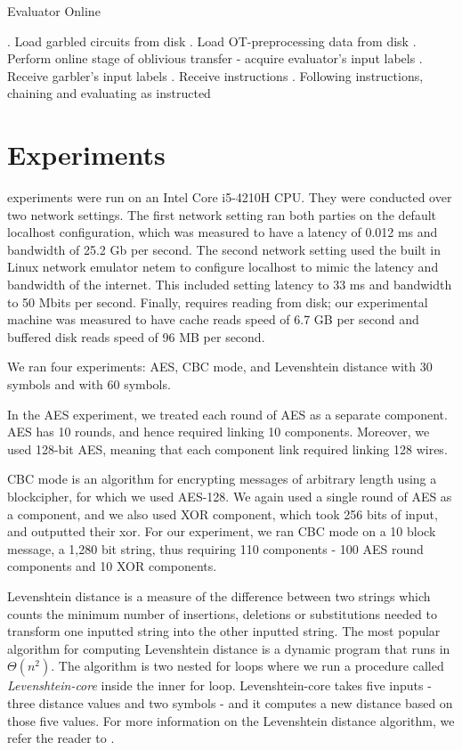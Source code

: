 \begin{algorithm}
    \caption{Evaluator Online}
    \label{alg:evaluator-online}
    \begin{algorithmic}
        . Load garbled circuits from disk
        . Load OT-preprocessing data from disk
        . Perform online stage of oblivious transfer - acquire evaluator's input labels
        . Receive garbler's input labels
        . Receive instructions
        . Following instructions, chaining and evaluating as instructed
    \end{algorithmic}
\end{algorithm}

\section{Experiments}
\CompGC experiments were run on an Intel Core i5-4210H CPU. 
They were conducted over two network settings. 
The first network setting ran both parties on the default localhost configuration, which was measured to have a latency of 0.012 ms and bandwidth of 25.2 Gb per second. 
The second network setting used the built in Linux network emulator {\sf netem} to configure localhost to mimic the latency and bandwidth of the internet. 
This included setting latency to 33 ms and bandwidth to 50 Mbits per second. 
Finally, \CompGC requires reading from disk; our experimental machine was measured to have cache reads speed of 6.7 GB per second and buffered disk reads speed of 96 MB per second.

We ran four experiments: AES, CBC mode, and Levenshtein distance with 30 symbols and with 60 symbols. 

In the AES experiment, we treated each round of AES as a separate component. AES has 10 rounds, and hence required linking 10 components. Moreover, we used 128-bit AES, meaning that each component link required linking 128 wires. 

CBC mode is an algorithm for encrypting messages of arbitrary length using a blockcipher, for which we used AES-128. 
We again used a single round of AES as a component, and we also used XOR component, which took 256 bits of input, and outputted their xor. 
For our experiment, we ran CBC mode on a 10 block message, a 1,280 bit string, thus requiring 110 components - 100 AES round components and 10 XOR components. 

Levenshtein distance is a measure of the difference between two strings which counts the minimum number of insertions, deletions or substitutions needed to transform one inputted string into the other inputted string. 
The most popular algorithm for computing Levenshtein distance is a dynamic program that runs in $\Theta(n^2)$. 
The algorithm is  two nested for loops where we run a procedure called \textit{Levenshtein-core} inside the inner for loop. 
Levenshtein-core takes five inputs - three distance values and two symbols - and it computes a new distance based on those five values.
For more information on the Levenshtein distance algorithm, we refer the reader to \cite{wiki-leven}. 

